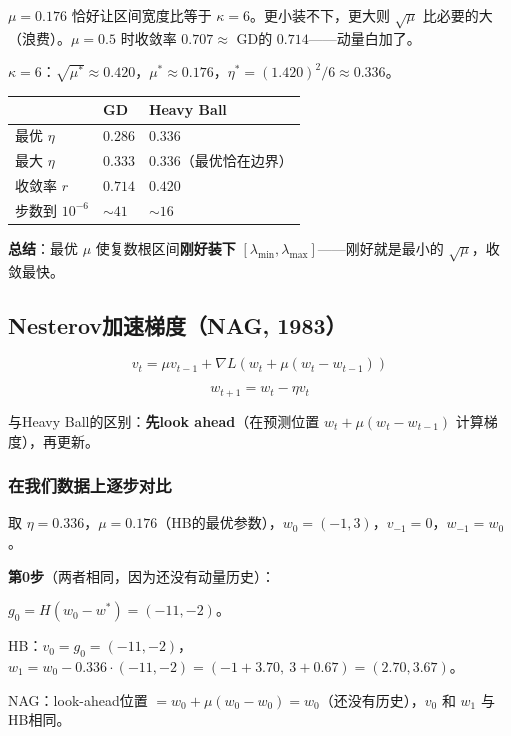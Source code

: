 \documentclass[12pt,a4paper]{article}
\begin{document}
$\mu = 0.176$ 恰好让区间宽度比等于 $\kappa = 6$。更小装不下，更大则 $\sqrt\mu$ 比必要的大（浪费）。$\mu = 0.5$ 时收敛率 $0.707 \approx$ GD的 $0.714$——动量白加了。

$\kappa = 6$：$\sqrt{\mu^*} \approx 0.420$，$\mu^* \approx 0.176$，$\eta^* = (1.420)^2/6 \approx 0.336$。







\begin{center}\small
\begin{longtable}{|l|l|l|}
\hline
 & GD & Heavy Ball \\
\hline
最优 $\eta$ & $0.286$ & $0.336$ \\
最大 $\eta$ & $0.333$ & $0.336$（最优恰在边界） \\
收敛率 $r$ & $0.714$ & $0.420$ \\
步数到 $10^{-6}$ & $\sim 41$ & $\sim 16$ \\
\hline
\end{longtable}
\end{center}


\textbf{总结}：最优 $\mu$ 使复数根区间\textbf{刚好装下} $[\lambda_{\min}, \lambda_{\max}]$——刚好就是最小的 $\sqrt\mu$，收敛最快。


\subsection{Nesterov加速梯度（NAG, 1983）}


\[v_t = \mu v_{t-1} + \nabla L(w_t + \mu(w_t - w_{t-1}))\]

\[w_{t+1} = w_t - \eta v_t\]

与Heavy Ball的区别：\textbf{先look ahead}（在预测位置 $w_t + \mu(w_t - w_{t-1})$ 计算梯度），再更新。


\subsubsection{在我们数据上逐步对比}

取 $\eta = 0.336$，$\mu = 0.176$（HB的最优参数），$w_0 = (-1, 3)$，$v_{-1} = 0$，$w_{-1} = w_0$。

\textbf{第0步}（两者相同，因为还没有动量历史）：

$g_0 = H(w_0 - w^*) = (-11, -2)$。

HB：$v_0 = g_0 = (-11, -2)$，$w_1 = w_0 - 0.336 \cdot (-11,-2) = (-1+3.70,\ 3+0.67) = (2.70, 3.67)$。

NAG：look-ahead位置 $= w_0 + \mu(w_0 - w_0) = w_0$（还没有历史），$v_0$ 和 $w_1$ 与HB相同。
\end{document}
